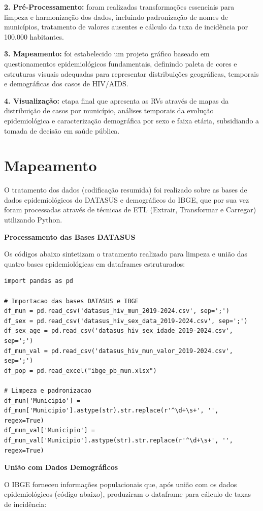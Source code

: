 \documentclass[10pt,a4paper]{article}
\begin{document}
\begin{multicols}{2}
\textbf{2. Pré-Processamento:} foram realizadas transformações essenciais para limpeza e harmonização dos dados, incluindo padronização de nomes de municípios, tratamento de valores ausentes e cálculo da taxa de incidência por 100.000 habitantes.

\textbf{3. Mapeamento:} foi estabelecido um projeto gráfico baseado em questionamentos epidemiológicos fundamentais, definindo paleta de cores e estruturas visuais adequadas para representar distribuições geográficas, temporais e demográficas dos casos de HIV/AIDS.

\textbf{4. Visualização:} etapa final que apresenta as RVs através de mapas da distribuição de casos por município, análises temporais da evolução epidemiológica e caracterização demográfica por sexo e faixa etária, subsidiando a tomada de decisão em saúde pública.

\section{Mapeamento}

O tratamento dos dados (codificação resumida) foi realizado sobre as bases de dados epidemiológicos do DATASUS e demográficos do IBGE, que por sua vez foram processadas através de técnicas de ETL (Extrair, Transformar e Carregar) utilizando Python.

\textbf{Processamento das Bases DATASUS}

Os códigos abaixo sintetizam o tratamento realizado para limpeza e união das quatro bases epidemiológicas em dataframes estruturados:

\begin{lstlisting}
import pandas as pd

# Importacao das bases DATASUS e IBGE
df_mun = pd.read_csv('datasus_hiv_mun_2019-2024.csv', sep=';')
df_sex = pd.read_csv('datasus_hiv_sex_data_2019-2024.csv', sep=';')
df_sex_age = pd.read_csv('datasus_hiv_sex_idade_2019-2024.csv', sep=';')
df_mun_val = pd.read_csv('datasus_hiv_mun_valor_2019-2024.csv', sep=';')
df_pop = pd.read_excel("ibge_pb_mun.xlsx")

# Limpeza e padronizacao
df_mun['Municipio'] = df_mun['Municipio'].astype(str).str.replace(r'^\d+\s+', '', regex=True)
df_mun_val['Municipio'] = df_mun_val['Municipio'].astype(str).str.replace(r'^\d+\s+', '', regex=True)
\end{lstlisting}

\textbf{União com Dados Demográficos}

O IBGE forneceu informações populacionais que, após união com os dados epidemiológicos (código abaixo), produziram o dataframe para cálculo de taxas de incidência:


\end{multicols}
\end{document}
